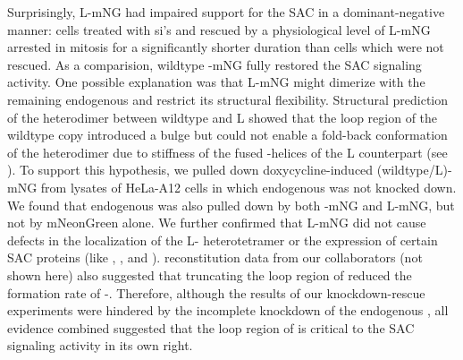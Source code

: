 Surprisingly, \textDelta{}L-mNG had impaired support for the SAC in a dominant-negative manner: cells treated with si's and rescued by a physiological level of \textDelta{}L-mNG arrested in mitosis for a significantly shorter duration than cells which were not rescued. As a comparision, wildtype -mNG fully restored the SAC signaling activity. One possible explanation was that \textDelta{}L-mNG might dimerize with the remaining endogenous  and restrict its structural flexibility. Structural prediction of the heterodimer between wildtype  and \textDelta{}L showed that the loop region of the wildtype copy introduced a bulge but could not enable a fold-back conformation of the heterodimer due to stiffness of the fused \textalpha{}-helices of the \textDelta{}L counterpart (see ). To support this hypothesis, we pulled down doxycycline-induced (wildtype/\textDelta{}L)-mNG from lysates of HeLa-A12 cells in which endogenous  was not knocked down. We found that endogenous  was also pulled down by both -mNG and \textDelta{}L-mNG, but not by mNeonGreen alone. We further confirmed that \textDelta{}L-mNG did not cause defects in the localization of the \textDelta{}L- heterotetramer or the expression of certain SAC proteins (like , , and ).  reconstitution data from our collaborators (not shown here) also suggested that truncating the loop region of  reduced the formation rate of -. Therefore, although the results of our knockdown-rescue experiments were hindered by the incomplete knockdown of the endogenous , all evidence combined suggested that the loop region of  is critical to the SAC signaling activity in its own right.
